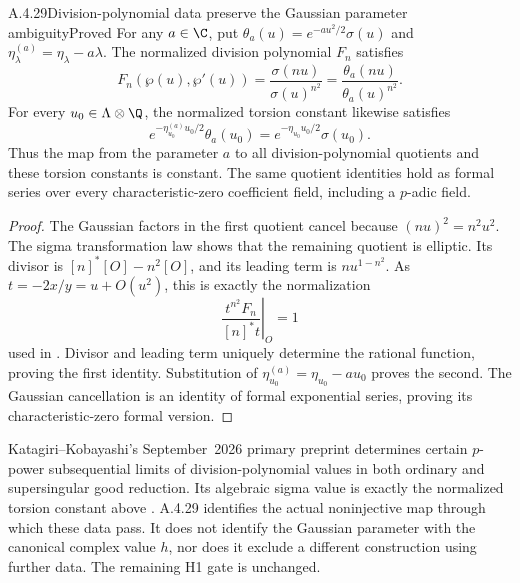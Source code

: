 \begin{result}{A.4.29}{Division-polynomial data preserve the Gaussian parameter ambiguity}{Proved}
For any $a\in\C$, put $\theta_a(u)=e^{-au^2/2}\sigma(u)$ and
$\eta^{(a)}_\lambda=\eta_\lambda-a\lambda$. The normalized division polynomial $F_n$ satisfies
\[
 F_n(\wp(u),\wp'(u))
 =\frac{\sigma(nu)}{\sigma(u)^{n^2}}
 =\frac{\theta_a(nu)}{\theta_a(u)^{n^2}}.
\]
For every $u_0\in\Lambda\otimes\Q$, the normalized torsion constant likewise satisfies
\[
 e^{-\eta^{(a)}_{u_0}u_0/2}\theta_a(u_0)
 =e^{-\eta_{u_0}u_0/2}\sigma(u_0).
\]
Thus the map from the parameter $a$ to all division-polynomial quotients and these torsion constants is constant. The same quotient identities hold as formal series over every characteristic-zero coefficient field, including a $p$-adic field.
\end{result}
\begin{proof}
The Gaussian factors in the first quotient cancel because $(nu)^2=n^2u^2$. The sigma transformation law shows that the remaining quotient is elliptic. Its divisor is $[n]^*[O]-n^2[O]$, and its leading term is $n u^{1-n^2}$. As $t=-2x/y=u+O(u^2)$, this is exactly the normalization
\[
 \left.\frac{t^{n^2}F_n}{[n]^*t}\right|_O=1
\]
used in \cite[p.2]{EllKatagiriKobayashi2026}. Divisor and leading term uniquely determine the rational function, proving the first identity. Substitution of $\eta^{(a)}_{u_0}=\eta_{u_0}-au_0$ proves the second. The Gaussian cancellation is an identity of formal exponential series, proving its characteristic-zero formal version.
\end{proof}

Katagiri--Kobayashi's September~2026 primary preprint \cite[Theorem 1.3 and Corollary 1.4, pp.3--4]{EllKatagiriKobayashi2026} determines certain $p$-power subsequential limits of division-polynomial values in both ordinary and supersingular good reduction. Its algebraic sigma value is exactly the normalized torsion constant above \cite[Definition 2.3, Proposition 2.5, and Theorem 2.7, pp.6--7]{EllKatagiriKobayashi2026}. A.4.29 identifies the actual noninjective map through which these data pass. It does not identify the Gaussian parameter with the canonical complex value $h$, nor does it exclude a different construction using further data. The remaining H1 gate is unchanged.

